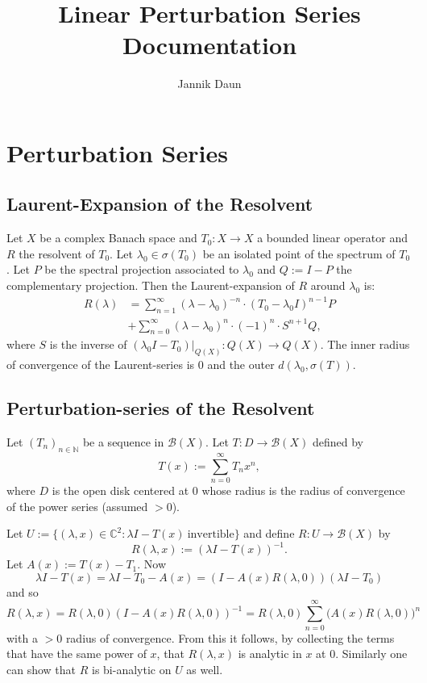 \documentclass[11pt]{article}
\title{Linear Perturbation Series Documentation}
\author{Jannik Daun}
\begin{document}
\maketitle
\tableofcontents

\section{Perturbation Series}
\subsection{Laurent-Expansion of the Resolvent}
Let $X$ be a complex Banach space and $T_0 :X \to X$ a bounded linear 
operator and $R$ the resolvent of $T_0$.
Let $ \lambda_0 \in \sigma (T_0)$ be an isolated point of the spectrum
of $T_0$. Let $P$ be the spectral projection associated to $\lambda_0$
and $Q:=I-P$ the complementary projection.
Then the Laurent-expansion of $R$ around $\lambda_0$ is:
\begin{equation}
    \begin{split}
        R(\lambda) &=
         \sum_{n=1}^\infty (\lambda - \lambda_0)^{-n} \cdot (T_0- \lambda_0I)^{n-1} P  \\
    &+ \sum_{n=0}^\infty (\lambda - \lambda_0)^n \cdot (-1)^n \cdot  S^{n+1} Q ,
    \end{split}
\end{equation}
where $S$ is the inverse of $(\lambda_0 I- T_0)|_{Q(X)}: Q(X) \to Q(X)$.
The inner radius of convergence of the Laurent-series is $0$ and the outer $d(\lambda_0 , \sigma(T))$.

\subsection{Perturbation-series of the Resolvent}
Let $(T_n)_{n \in \mathbb{N}}$ be a sequence in $\mathscr{B}(X)$.
Let $T : D \to \mathscr{B}(X)$ defined by
\begin{equation}
    T(x) := \sum_{n=0}^\infty T_n x^n,
\end{equation}
where $D$ is the open disk centered at 0 whose radius is the radius of
convergence of the power series (assumed $>0$).

Let $U:= \{ (\lambda, x) \in \mathbb{C}^2 : \lambda I - T(x) \ \text{invertible} \}$
and define
$R: U \to \mathscr{B}(X)$ by
\begin{equation}
    R(\lambda, x) := (\lambda I - T(x))^{-1}.
\end{equation}
Let $A(x):= T(x)-T_1$.
Now 
\begin{equation}
   \lambda I - T (x) = \lambda I - T_0 - A(x) = ( I - A(x) R(\lambda,0)) (\lambda I -T_0)
\end{equation}
and so 
\begin{equation}
    \label{eq:eq_R_expansion}
    R(\lambda,x) = R(\lambda,0)  ( I - A(x) R(\lambda,0))^{-1} = 
    R(\lambda,0)  \sum_{n=0}^\infty  (A(x) R(\lambda,0) \big)^n
\end{equation}
with a $>0$ radius of convergence.
From this it follows, by collecting the terms that have the same power of $x$,
that $R(\lambda,x)$ is analytic in $x$ at $0$.
Similarly one can show that $R$ is bi-analytic on $U$ as well.
\end{document}
